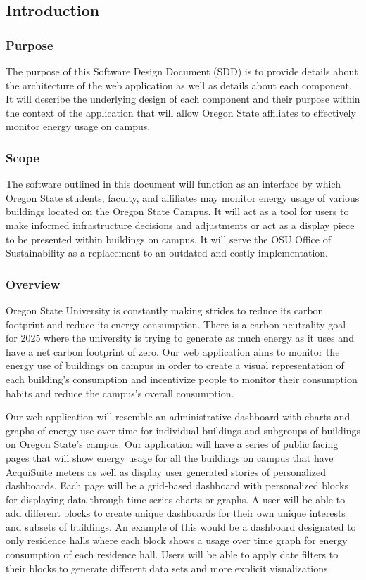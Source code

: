 \subsection{Introduction}
\subsubsection{Purpose}

The purpose of this Software Design Document (SDD) is to provide details about the architecture of the web application as well
as details about each component. It will describe the underlying design of each component and their purpose within the context
of the application that will allow Oregon State affiliates to effectively monitor energy usage on campus.

\subsubsection{Scope}

The software outlined in this document will function as an interface by which Oregon State students, faculty, and affiliates
may monitor energy usage of various buildings located on the Oregon State Campus. It will act as a tool for users to 
make informed infrastructure decisions and adjustments or act as a display piece to be presented within buildings on campus.
It will serve the OSU Office of Sustainability as a replacement to an outdated and costly implementation. 

\subsubsection{Overview}
Oregon State University is constantly making strides to reduce its carbon footprint and reduce its energy consumption. There is a carbon neutrality goal for 2025 where the university is trying to generate as much energy as it uses and have a net carbon footprint of zero. Our web application aims to monitor the energy use of buildings on campus in order to create a visual representation of each building's consumption and incentivize people to monitor their consumption habits and reduce the campus's overall consumption.

\noindent Our web application will resemble an administrative dashboard with charts and graphs of energy use over time for individual buildings and subgroups of buildings on Oregon State's campus. 
Our application will have a series of public facing pages that will show energy usage for all the buildings on campus that have AcquiSuite meters as well as display user generated stories of personalized dashboards. Each page will be a grid-based dashboard with personalized blocks for displaying data through time-series charts or graphs. A user will be able to add different blocks to create unique dashboards for their own unique interests and subsets of buildings. An example of this would be a dashboard designated to only residence halls where each block shows a usage over time graph for energy consumption of each residence hall. Users will be able to apply date filters to their blocks to generate different data sets and more explicit visualizations.

